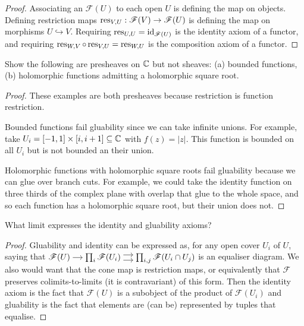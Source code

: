 \documentclass{article}
\begin{document}
\begin{proof}
    Associating an \(\mathscr{F}(U)\) to each open \(U\) is defining the map on objects.
    Defining restriction maps \(\operatorname{res}_{V,U} : \mathscr{F}(V) \to \mathscr{F}(U)\) is defining the map on morphisms \(U \hookrightarrow V\).
    Requiring \(\operatorname{res}_{U, U} = \mathrm{id}_{\mathscr{F}(U)}\) is the identity axiom of a functor, and requiring \(\operatorname{res}_{W, V} \circ \operatorname{res}_{V, U} = \operatorname{res}_{W, U}\) is the composition axiom of a functor.
\end{proof}

\begin{exercise}
    Show the following are presheaves on \(\mathbb{C}\) but not sheaves: (a) bounded functions, (b) holomorphic functions admitting a holomorphic square root.
\end{exercise}
\begin{proof}
    These examples are both presheaves because restriction is function restriction.

    Bounded functions fail gluability since we can take infinite unions.
    For example, take \(U_i = [-1, 1] \times [i, i+1] \subseteq \mathbb{C}\) with \(f(z) = |z|\).
    This function is bounded on all \(U_i\) but is not bounded an their union.

    Holomorphic functions with holomorphic square roots fail gluability because we can glue over branch cuts.
    For example, we could take the identity function on three thirds of the complex plane with overlap that glue to the whole space, and so each function has a holomorphic square root, but their union does not.
\end{proof}

\begin{exercise}
    What limit expresses the identity and gluability axioms?
\end{exercise}
\begin{proof}
    Gluability and identity can be expressed as, for any open cover \(U_i\) of \(U\), saying that
    \(\begin{tikzcd}[cramped, sep=small] \mathscr{F}(U) \arrow[r] & \prod_i \mathscr{F}(U_i) \arrow[r, shift left=0.75ex] \arrow[r, shift right=0.75ex] & \prod_{i, j} \mathscr{F}(U_i \cap U_j) \end{tikzcd}\)
    is an equaliser diagram.
    We also would want that the cone map is restriction maps, or equivalently that \(\mathscr{F}\) preserves colimits-to-limits (it is contravariant) of this form.
    Then the identity axiom is the fact that \(\mathscr{F}(U)\) is a subobject of the product of \(\mathscr{F}(U_i)\) and gluability is the fact that elements are (can be) represented by tuples that equalise.
\end{proof}
\end{document}

